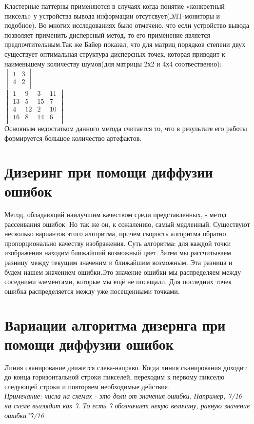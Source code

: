 Кластерные паттерны применяются в случаях когда понятие «конкретный пиксель» у устройства вывода информации отсутсвует(ЭЛТ-мониторы и подобное). Во многих исследованиях \cite{Bayer}\cite{Dh} было отмечено, что если устройство вывода позволяет применить дисперсный метод, то его применение является предпочтительным.Так же Байер \cite{Bayer} показал, что для матриц порядков степени двух существует оптимальная структура дисперсных точек, которая приводит к наименьшему количеству шумов(для матрицы 2х2 и 4х4 соотвественно):\\
$\begin{vmatrix}
1 & 3 \\          
4 & 2   \\
\end{vmatrix}$
 \\
 $\begin{vmatrix}
1& 9& 3& 11\\
13& 5& 15& 7\\
4& 12& 2& 10\\
16& 8&14&6\\
\end{vmatrix}$\\
Основным недостатком данного метода считается то, что в результате его работы формируется большое количество артефактов\cite{Ulich}.
\section{Дизеринг при помощи диффузии ошибок}
 Метод, обладающий наилучшим качеством среди представленных, - метод рассеивания ошибок. Но так же он, к сожалению, самый медленный.\cite{Dh} Существуют несколько вариантов этого алгоритма, причем скорость алгоритма обратно пропорционально качеству изображения.\cite{Dh}
Суть алгоритма: для каждой точки изображения находим ближайший возможный цвет. Затем мы рассчитываем разницу между текущим значеним и ближайшим возможным. Эта разница и будем нашем значением ошибки.Это значение ошибки мы распределяем между соседними элементами, которые мы ещё не посещали. Для последних точек ошибка распределяется между уже посещенными точками.
\section{Вариации алгоритма дизернга при помощи диффузии ошибок}
Линия сканирование движется слева-направо. Когда линия сканирования доходит до конца горизонтальной строки пикселей, переходим к первому пикселю следующей строки и повторяем необходимые действия.\\
 \textit{Примечание: числа на схемах - это доли от значения  ошибки. Например, 7/16 на схеме выглядит как 7. То есть 7 обозначает некую величину, равную значение ошибки*7/16 }

